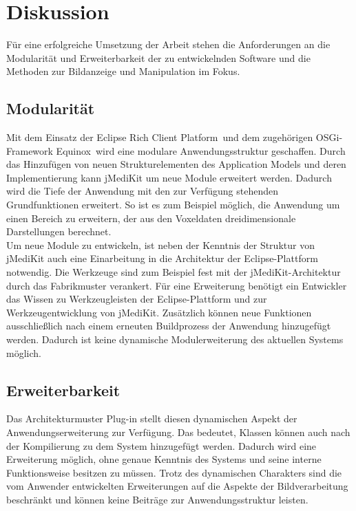 \chapter{Diskussion}

Für eine erfolgreiche Umsetzung der Arbeit stehen die Anforderungen an die Modularität und Erweiterbarkeit der zu entwickelnden Software und die Methoden zur Bildanzeige und Manipulation im Fokus. 

\section*{Modularität}

Mit dem Einsatz der \glqq Eclipse Rich Client Platform\grqq\ und dem zugehörigen OSGi-Framework \glqq Equinox\grqq\ wird eine modulare Anwendungsstruktur geschaffen. Durch das Hinzufügen von neuen Strukturelementen des Application Models und deren Implementierung kann jMediKit um neue Module erweitert werden. Dadurch wird die Tiefe der Anwendung mit den zur Verfügung stehenden Grundfunktionen erweitert. So ist es zum Beispiel möglich, die Anwendung um einen Bereich zu erweitern, der aus den Voxeldaten dreidimensionale Darstellungen berechnet.\\
Um neue Module zu entwickeln, ist neben der Kenntnis der Struktur von jMediKit auch eine Einarbeitung in die Architektur der Eclipse-Plattform notwendig. Die Werkzeuge sind zum Beispiel fest mit der jMediKit-Architektur durch das Fabrikmuster verankert. Für eine Erweiterung benötigt ein Entwickler das Wissen zu Werkzeugleisten der Eclipse-Plattform und zur Werkzeugentwicklung von jMediKit. Zusätzlich können neue Funktionen ausschließlich nach einem erneuten Buildprozess der Anwendung hinzugefügt werden. Dadurch ist keine dynamische Modulerweiterung des aktuellen Systems möglich.

\pagebreak

\section*{Erweiterbarkeit}
Das Architekturmuster Plug-in stellt diesen dynamischen Aspekt der Anwendungserweiterung zur Verfügung. Das bedeutet, Klassen können auch nach der Kompilierung zu dem System hinzugefügt werden. Dadurch wird eine Erweiterung möglich, ohne genaue Kenntnis des Systems und seine interne Funktionsweise besitzen zu müssen. Trotz des dynamischen Charakters sind die vom Anwender entwickelten Erweiterungen auf die Aspekte der Bildverarbeitung beschränkt und können keine Beiträge zur Anwendungsstruktur leisten.

